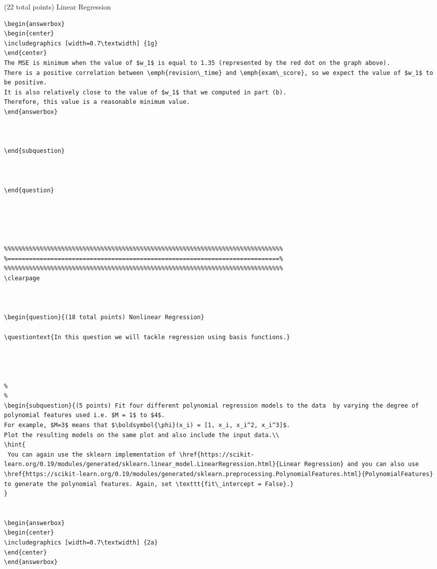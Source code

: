 \documentclass[12pt]{article}
\begin{document}
\begin{question}{(22 total points) Linear Regression}
\begin{subquestion}
\begin{answerbox}{20em}
\begin {verbatim}
\begin{answerbox}{35em}
\begin{center}
\includegraphics [width=0.7\textwidth] {1g}
\end{center}
The MSE is minimum when the value of $w_1$ is equal to 1.35 (represented by the red dot on the graph above). 
There is a positive correlation between \emph{revision\_time} and \emph{exam\_score}, so we expect the value of $w_1$ to be positive.  
It is also relatively close to the value of $w_1$ that we computed in part (b).
Therefore, this value is a reasonable minimum value.
\end{answerbox}



\end{subquestion}


 
\end{question}





\clearpage



\begin{question}{(18 total points) Nonlinear Regression}

\questiontext{In this question we will tackle regression using basis functions.}




%
%
\begin{subquestion}{(5 points) Fit four different polynomial regression models to the data  by varying the degree of polynomial features used i.e. $M = 1$ to $4$.
For example, $M=3$ means that $\boldsymbol{\phi}(x_i) = [1, x_i, x_i^2, x_i^3]$.
Plot the resulting models on the same plot and also include the input data.\\
\hint{
 You can again use the sklearn implementation of \href{https://scikit-learn.org/0.19/modules/generated/sklearn.linear_model.LinearRegression.html}{Linear Regression} and you can also use \href{https://scikit-learn.org/0.19/modules/generated/sklearn.preprocessing.PolynomialFeatures.html}{PolynomialFeatures} to generate the polynomial features. Again, set \texttt{fit\_intercept = False}.}
}


\begin{answerbox}{35em}
\begin{center}
\includegraphics [width=0.7\textwidth] {2a}
\end{center}
\end{answerbox}




\end{verbatim}
\end{answerbox}
\end{subquestion}
\end{question}
\end{document}
